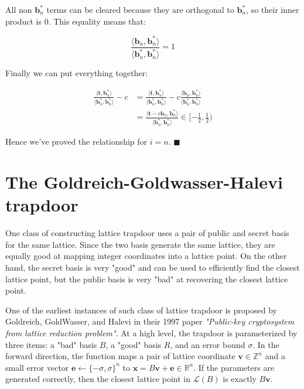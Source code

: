 \documentclass[letterpaper,12pt]{article}
\begin{document}
All non $\mathbf{b}_n^\ast$ terms can be cleared because they are orthogonal to $\mathbf{b}_n^\ast$, so their inner product is 0. This equality means that:

$$
\frac{
    \langle\mathbf{b}_n, \mathbf{b}_n^\ast\rangle
}{
    \langle\mathbf{b}_n^\ast, \mathbf{b}_n^\ast\rangle
} = 1
$$

Finally we can put everything together:

$$
\begin{aligned}
\frac{
    \langle\mathbf{t}, \mathbf{b}_n^\ast\rangle
}{
    \langle\mathbf{b}_n^\ast, \mathbf{b}_n^\ast\rangle
}
- c 
&= \frac{
    \langle\mathbf{t}, \mathbf{b}_n^\ast\rangle
}{
    \langle\mathbf{b}_n^\ast, \mathbf{b}_n^\ast\rangle
}
- c \frac{
    \langle\mathbf{b}_n, \mathbf{b}_n^\ast\rangle
}{
    \langle\mathbf{b}_n^\ast, \mathbf{b}_n^\ast\rangle
} \\
&= \frac{
    \langle\mathbf{t} - c\mathbf{b}_n, \mathbf{b}_n^\ast\rangle
}{
    \langle\mathbf{b}_n^\ast, \mathbf{b}_n^\ast\rangle
}
\in [-\frac{1}{2}, \frac{1}{2})
\end{aligned}
$$

Hence we've proved the relationship for $i = n$. $\blacksquare$

\section{The Goldreich-Goldwasser-Halevi trapdoor}
One class of constructing lattice trapdoor uses a pair of public and secret basis for the same lattice. Since the two basis generate the same lattice, they are equally good at mapping integer coordinates into a lattice point. On the other hand, the secret basis is very "good" and can be used to efficiently find the closest lattice point, but the public basis is very "bad" at recovering the closest lattice point.

One of the earliest instances of such class of lattice trapdoor is proposed by Goldreich, GoldWasser, and Halevi in their 1997 paper \textit{"Public-key cryptosystem from lattice reduction problem"}. At a high level, the trapdoor is parameterized by three items: a "bad" basis $B$, a "good" basis $R$, and an error bound $\sigma$. In the forward direction, the function maps a pair of lattice coordinate $\mathbf{v} \in \mathbb{Z}^n$ and a small error vector $\mathbf{e} \leftarrow \{ -\sigma, \sigma \}^n$ to $\mathbf{x} = B\mathbf{v} + \mathbf{e} \in \mathbb{R}^n$. If the parameters are generated correctly, then the closest lattice point in $\mathcal{L}(B)$ is exactly $B\mathbf{v}$.
\end{document}
